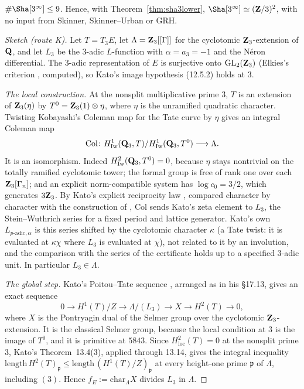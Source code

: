 \begin{theorem}\label{thm:routek}
$\#\Sha[3^\infty]\le9$. Hence, with Theorem~\ref{thm:sha3lower}, $\Sha[3^\infty]\simeq(\Z/3)^2$, with no input from Skinner, Skinner--Urban or GRH.
\end{theorem}
\begin{proof}[Sketch (route K)]
Let $T=T_3E$, let $\Lambda=\mathbf{Z}_3[[\Gamma]]$ for the cyclotomic $\mathbf{Z}_3$-extension of $\mathbf{Q}$, and let $L_3$ be the $3$-adic $L$-function with $\alpha=a_3=-1$ and the N\'eron differential. The $3$-adic representation of $E$ is surjective onto $\operatorname{GL}_2(\mathbf{Z}_3)$ (Elkies's criterion \cite{elkies3}, computed), so Kato's image hypothesis (12.5.2) holds at $3$.

\emph{The local construction.} At the nonsplit multiplicative prime $3$, $T$ is an extension of $\mathbf{Z}_3(\eta)$ by $T^0=\mathbf{Z}_3(1)\otimes\eta$, where $\eta$ is the unramified quadratic character. Twisting Kobayashi's Coleman map for the Tate curve \cite{kobayashi06} by $\eta$ gives an integral Coleman map
\[
\mathrm{Col}\colon H^1_{\mathrm{Iw}}(\mathbf{Q}_3,T)/H^1_{\mathrm{Iw}}(\mathbf{Q}_3,T^0)\longrightarrow\Lambda .
\]
It is an isomorphism. Indeed $H^2_{\mathrm{Iw}}(\mathbf{Q}_3,T^0)=0$, because $\eta$ stays nontrivial on the totally ramified cyclotomic tower; the formal group is free of rank one over each $\mathbf{Z}_3[\Gamma_n]$; and an explicit norm-compatible system has $\log c_0=3/2$, which generates $3\mathbf{Z}_3$. By Kato's explicit reciprocity law \cite[12.5(1)]{kato}, compared character by character with the construction of \cite[\S3.2]{sw}, $\mathrm{Col}$ sends Kato's zeta element to $L_3$, the Stein--Wuthrich series for a fixed period and lattice generator. Kato's own $L_{p\text{-adic},\alpha}$ is this series shifted by the cyclotomic character $\kappa$ (a Tate twist: it is evaluated at $\kappa\chi$ where $L_3$ is evaluated at $\chi$), not related to it by an involution, and the comparison with the series of the certificate holds up to a specified $3$-adic unit. In particular $L_3\in\Lambda$.

\emph{The global step.} Kato's Poitou--Tate sequence \cite[14.9.3 and 17.10]{kato}, arranged as in his \S17.13, gives an exact sequence
\[
0\to H^1(T)/Z\to\Lambda/(L_3)\to X\to H^2(T)\to0 ,
\]
where $X$ is the Pontryagin dual of the Selmer group over the cyclotomic $\mathbf{Z}_3$-extension. It is the classical Selmer group, because the local condition at $3$ is the image of $T^0$, and it is primitive at $5843$. Since $H^2_{\mathrm{loc}}(T)=0$ at the nonsplit prime $3$, Kato's Theorem~13.4(3), applied through 13.14, gives the integral inequality $\mathrm{length}\,H^2(T)_{\mathfrak p}\le\mathrm{length}\,(H^1(T)/Z)_{\mathfrak p}$ at every height-one prime $\mathfrak p$ of $\Lambda$, including $(3)$. Hence $f_E:=\mathrm{char}_\Lambda X$ divides $L_3$ in $\Lambda$.


\end{proof}
